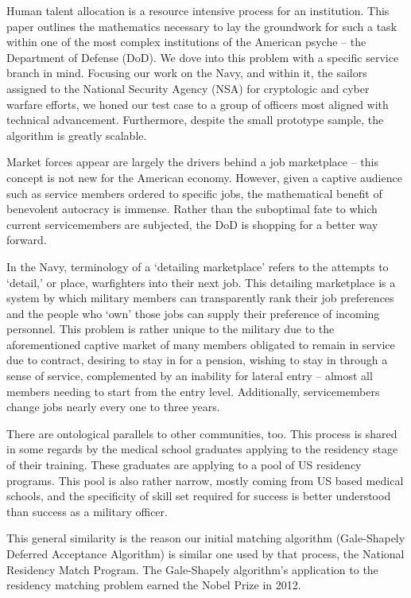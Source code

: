 Human talent allocation is a resource intensive process for an institution. This paper outlines the mathematics necessary to lay the groundwork for such a task within one of the most complex institutions of the American psyche -- the Department of Defense (DoD).  We dove into this problem with a specific service branch in mind.  Focusing our work on the Navy, and within it, the sailors assigned to the National Security Agency (NSA) for cryptologic and cyber warfare efforts, we honed our test case to a group of officers most aligned with technical advancement. Furthermore, despite the small prototype sample, the algorithm is greatly scalable. 

Market forces appear are largely the drivers behind a job marketplace -- this concept is not new for the American economy.  However, given a captive audience such as service members ordered to specific jobs, the mathematical benefit of benevolent autocracy is immense.  Rather than the suboptimal fate to which current servicemembers are subjected, the DoD is shopping for a better way forward.  

In the Navy, terminology of a ‘detailing marketplace’ refers to the attempts to ‘detail,’ or place, warfighters into their next job.  This detailing marketplace is a system by which military members can transparently rank their job preferences and the people who ‘own’ those jobs can supply their preference of incoming personnel. This problem is rather unique to the military due to the aforementioned captive market of many members obligated to remain in service due to contract, desiring to stay in for a pension, wishing to stay in through a sense of service, complemented by an inability for lateral entry -- almost all members needing to start from the entry level.  Additionally, servicemembers change jobs nearly every one to three years. 

There are ontological parallels to other communities, too. This process is shared in some regards by the medical school graduates applying to the residency stage of their training. These graduates are applying to a pool of US residency programs. This pool is also rather narrow, mostly coming from US based medical schools, and the specificity of skill set required for success is better understood than success as a military officer. 

This general similarity is the reason our initial matching algorithm (Gale-Shapely Deferred Acceptance Algorithm) is similar one used by that process, the National Residency Match Program. The Gale-Shapely algorithm's application to the residency matching problem earned the Nobel Prize in 2012.

